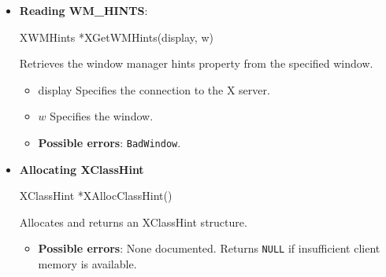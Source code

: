 \documentclass{report}
\begin{document}
\begin{itemize}
        \item \textbf{Reading WM\_HINTS}:
            \bigbreak \noindent 
            \begin{cppcode}
                XWMHints *XGetWMHints(display, w)
            \end{cppcode}
            \bigbreak \noindent
            Retrieves the window manager hints property from the specified window.
            \begin{itemize}
                \item display Specifies the connection to the X server.
                \item $w$ Specifies the window.
            \end{itemize}
            \begin{itemize}
                \item \textbf{Possible errors}: \texttt{BadWindow}.
            \end{itemize}

        \item \textbf{Allocating XClassHint}
            \bigbreak \noindent 
            \begin{cppcode}
                XClassHint *XAllocClassHint()
            \end{cppcode}
            \bigbreak \noindent
            Allocates and returns an XClassHint structure.
            \begin{itemize}
                \item \textbf{Possible errors}: None documented. Returns \texttt{NULL} if insufficient client memory is available.
            \end{itemize}


\end{itemize}
\end{document}
